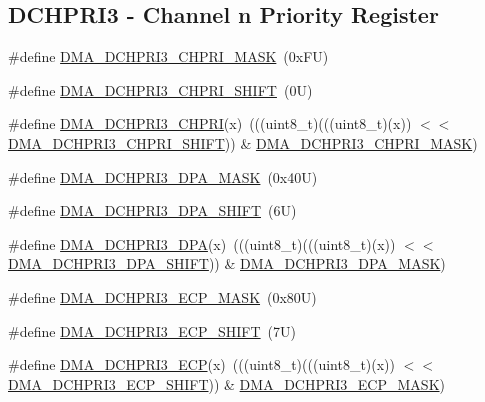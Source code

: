 \subsection*{D\+C\+H\+P\+R\+I3 -\/ Channel n Priority Register}
\begin{DoxyCompactItemize}
\item 
\#define \mbox{\hyperlink{group___d_m_a___register___masks_ga4d1165f5fe24dfa63c7496f07b15e5e2}{D\+M\+A\+\_\+\+D\+C\+H\+P\+R\+I3\+\_\+\+C\+H\+P\+R\+I\+\_\+\+M\+A\+SK}}~(0x\+F\+U)
\item 
\#define \mbox{\hyperlink{group___d_m_a___register___masks_gacae7dcb7b9055f80ce91ce52e36d57b6}{D\+M\+A\+\_\+\+D\+C\+H\+P\+R\+I3\+\_\+\+C\+H\+P\+R\+I\+\_\+\+S\+H\+I\+FT}}~(0\+U)
\item 
\#define \mbox{\hyperlink{group___d_m_a___register___masks_gabac1032f1fad2a3a27d92490812c6eb3}{D\+M\+A\+\_\+\+D\+C\+H\+P\+R\+I3\+\_\+\+C\+H\+P\+RI}}(x)~(((uint8\+\_\+t)(((uint8\+\_\+t)(x)) $<$$<$ \mbox{\hyperlink{group___d_m_a___register___masks_gacae7dcb7b9055f80ce91ce52e36d57b6}{D\+M\+A\+\_\+\+D\+C\+H\+P\+R\+I3\+\_\+\+C\+H\+P\+R\+I\+\_\+\+S\+H\+I\+FT}})) \& \mbox{\hyperlink{group___d_m_a___register___masks_ga4d1165f5fe24dfa63c7496f07b15e5e2}{D\+M\+A\+\_\+\+D\+C\+H\+P\+R\+I3\+\_\+\+C\+H\+P\+R\+I\+\_\+\+M\+A\+SK}})
\item 
\#define \mbox{\hyperlink{group___d_m_a___register___masks_gaef70570689d5f3d820526668a189e615}{D\+M\+A\+\_\+\+D\+C\+H\+P\+R\+I3\+\_\+\+D\+P\+A\+\_\+\+M\+A\+SK}}~(0x40\+U)
\item 
\#define \mbox{\hyperlink{group___d_m_a___register___masks_ga3efa0a806b45176edb7f736daf5ee774}{D\+M\+A\+\_\+\+D\+C\+H\+P\+R\+I3\+\_\+\+D\+P\+A\+\_\+\+S\+H\+I\+FT}}~(6\+U)
\item 
\#define \mbox{\hyperlink{group___d_m_a___register___masks_gadfab91518690d10b7513d2250f10f152}{D\+M\+A\+\_\+\+D\+C\+H\+P\+R\+I3\+\_\+\+D\+PA}}(x)~(((uint8\+\_\+t)(((uint8\+\_\+t)(x)) $<$$<$ \mbox{\hyperlink{group___d_m_a___register___masks_ga3efa0a806b45176edb7f736daf5ee774}{D\+M\+A\+\_\+\+D\+C\+H\+P\+R\+I3\+\_\+\+D\+P\+A\+\_\+\+S\+H\+I\+FT}})) \& \mbox{\hyperlink{group___d_m_a___register___masks_gaef70570689d5f3d820526668a189e615}{D\+M\+A\+\_\+\+D\+C\+H\+P\+R\+I3\+\_\+\+D\+P\+A\+\_\+\+M\+A\+SK}})
\item 
\#define \mbox{\hyperlink{group___d_m_a___register___masks_gabb8c04abc8cce4060af92862f34ed168}{D\+M\+A\+\_\+\+D\+C\+H\+P\+R\+I3\+\_\+\+E\+C\+P\+\_\+\+M\+A\+SK}}~(0x80\+U)
\item 
\#define \mbox{\hyperlink{group___d_m_a___register___masks_ga35828808080f8f51927f8731cf8be7bd}{D\+M\+A\+\_\+\+D\+C\+H\+P\+R\+I3\+\_\+\+E\+C\+P\+\_\+\+S\+H\+I\+FT}}~(7\+U)
\item 
\#define \mbox{\hyperlink{group___d_m_a___register___masks_ga7eb319ebed83594926c12f8d9d5a3d80}{D\+M\+A\+\_\+\+D\+C\+H\+P\+R\+I3\+\_\+\+E\+CP}}(x)~(((uint8\+\_\+t)(((uint8\+\_\+t)(x)) $<$$<$ \mbox{\hyperlink{group___d_m_a___register___masks_ga35828808080f8f51927f8731cf8be7bd}{D\+M\+A\+\_\+\+D\+C\+H\+P\+R\+I3\+\_\+\+E\+C\+P\+\_\+\+S\+H\+I\+FT}})) \& \mbox{\hyperlink{group___d_m_a___register___masks_gabb8c04abc8cce4060af92862f34ed168}{D\+M\+A\+\_\+\+D\+C\+H\+P\+R\+I3\+\_\+\+E\+C\+P\+\_\+\+M\+A\+SK}})
\end{DoxyCompactItemize}
